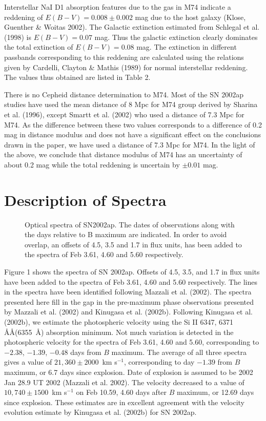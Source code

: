 Interstellar NaI D1 absorption features due to the gas in
M74 indicate a reddening of $E(B-V) = 0.008\pm 0.002$ mag due to the
host galaxy (Klose, Guenther \& Woitas 2002). The Galactic
extinction estimated from Schlegal et al. (1998) is $E(B-V) = 0.07$ mag.
Thus the galactic extinction clearly dominates the total extinction of 
$E(B-V) = 0.08$ mag. The extinction in different passbands
corresponding to this reddening are calculated using the relations given
by Cardelli, Clayton \& Mathis (1989) for normal interstellar reddening.
The values thus obtained are listed in Table 2.
 
There is no Cepheid distance determination to M74. Most of the SN 2002ap
studies have used the mean distance of 8 Mpc for M74 group derived by
Sharina et al. (1996), except Smartt et al. (2002) who used a distance
of 7.3 Mpc for M74. As the difference between these two values
corresponds to a difference of 0.2 mag in distance modulus and does not
have a significant effect on the conclusions drawn in the paper, we have
used a distance of 7.3 Mpc for M74. In the light of the above, we conclude
that distance modulus of M74 has an uncertainty of about 0.2 mag while
the total reddening is uncertain by $\pm 0.01$ mag.

\section{Description of Spectra}

\begin{figure}
\caption{Optical spectra of SN2002ap. The dates of observations along with 
the days relative to B maximum are indicated. In order to avoid  overlap, 
an offsets of 4.5, 3.5 and 1.7 in flux units, has been added to the 
spectra of Feb 3.61, 4.60 and 5.60 respectively.}
\end{figure}

Figure 1 shows the spectra of SN 2002ap. Offsets of 4.5, 3.5, and 1.7 in flux
units have been added to the spectra of Feb 3.61, 4.60 and 5.60 respectively.
The lines in the spectra have been identified following Mazzali et al. 
(2002). The spectra presented here fill in the gap in the pre-maximum phase
observations presented by Mazzali et al. (2002) and Kinugasa et al. (2002b). 
Following Kinugasa et al. (2002b), we estimate the photospheric velocity using
the Si II 6347, 6371 \AA\AA (6355~\AA) absorption minimum. Not much variation
is detected in the photospheric velocity for the spectra of Feb 3.61, 4.60
and 5.60, corresponding to $-2.38$, $-1.39$, $-0.48$ days from $B$ maximum. The
average of all three spectra gives a value of $21,360\pm 2000$~km s$^{-1}$, 
corresponding to day $-1.39$ from $B$ maximum, or 6.7 days since explosion.
Date of explosion is assumed to be 2002 Jan 28.9 UT 2002 (Mazzali et al. 2002). The 
velocity decreased to a value of $10,740\pm 1500$~km s$^{-1}$ on Feb 10.59,
4.60 days after $B$ maximum, or 12.69 days since explosion. These estimates are
in excellent agreement with the velocity evolution estimate by Kinugasa et al. 
(2002b) for SN 2002ap.

